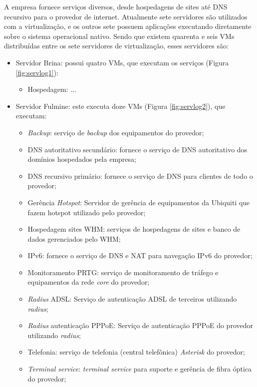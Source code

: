 A empresa fornece serviços diversos, desde hospedagens de sites até \ac{DNS} recursivo para o provedor de internet. Atualmente sete servidores 
são utilizados com a virtualização, e os outros sete possuem aplicações executando diretamente sobre o sistema operacional nativo. 
Sendo que existem quarenta e seis \ac{VM}s distribuídas entre os sete servidores de virtualização, esses servidores são:
\begin{itemize}
 \item Servidor Brina: possui quatro \ac{VM}s, que executam os serviços (Figura \ref{fig:servlog1}):
 \begin{itemize}
  \item Hospedagem: ...
 \end{itemize}
 \item Servidor Fulmine: este executa doze \ac{VM}s (Figura \ref{fig:servlog2}), que executam:
 \begin{itemize}
  \item \textit{Backup}: serviço de \textit{backup} dos equipamentos do provedor;
  \item \ac{DNS} autoritativo secundário: fornece o serviço de \ac{DNS} autoritativo dos domínios hospedados pela empresa;
  \item \ac{DNS} recursivo primário: fornece o serviço de \ac{DNS} para clientes de todo o provedor;
  \item Gerência \textit{Hotspot}: Servidor de gerência de equipamentos da Ubiquiti que fazem hotspot utilizado pelo provedor;
  \item Hospedagem sites \ac{WHM}: serviços de hospedagens de sites e banco de dados gerenciados pelo \ac{WHM};
  \item \ac{IPv6}: fornece o serviço de \ac{DNS} e \ac{NAT} para navegação \ac{IPv6} do provedor;
  \item Monitoramento \ac{PRTG}: serviço de monitoramento de tráfego e equipamentos da rede \textit{core} do provedor;
  \item \textit{Radius} \ac{ADSL}: Serviço de autenticação \ac{ADSL} de terceiros utilizando \textit{radius};
  \item \textit{Radius} autenticação \ac{PPPoE}: Serviço de autenticação \ac{PPPoE} do provedor utilizando \textit{radius};
  \item Telefonia: serviço de telefonia (central telefônica) \textit{Asterisk} do provedor;
  \item \textit{Terminal service}: \textit{terminal service} para suporte e gerência de fibra óptica do provedor;

\end{itemize}
\end{itemize}
